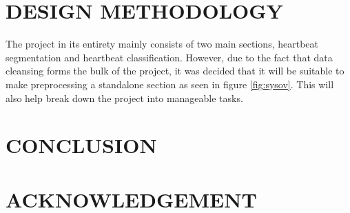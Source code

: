 \documentclass[10pt,twocolumn]{witseiepaper}
\begin{document}
%
\section{DESIGN METHODOLOGY}

The project in its entirety mainly consists of two main sections, heartbeat segmentation and heartbeat classification. However, due to the fact that data cleansing forms the bulk of the project, it was decided that it will be suitable to make preprocessing a standalone section as seen in figure \ref{fig:sysov}. This will also help break down the project into manageable tasks.
%
\section{CONCLUSION}



%
\section*{ACKNOWLEDGEMENT}



%



\end{document}
